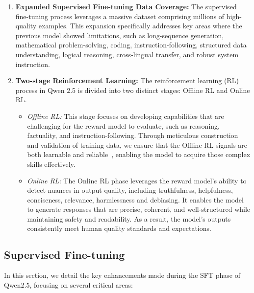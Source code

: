 \documentclass{article}
\begin{document}
\begin{enumerate}[label=(\arabic*)]

    \item \textbf{Expanded Supervised Fine-tuning Data Coverage:} The supervised fine-tuning process leverages a massive dataset comprising millions of high-quality examples.
    This expansion specifically addresses key areas where the previous model showed limitations, such as long-sequence generation, mathematical problem-solving, coding, instruction-following, structured data understanding, logical reasoning, cross-lingual transfer, and robust system instruction.

    \item \textbf{Two-stage Reinforcement Learning:} The reinforcement learning (RL) process in Qwen 2.5 is divided into two distinct stages: Offline RL and Online RL. 

        \begin{itemize}

            \item \textit{Offline RL:} This stage focuses on developing capabilities that are challenging for the reward model to evaluate, such as reasoning, factuality, and instruction-following.
            Through meticulous construction and validation of training data, we ensure that the Offline RL signals are both learnable and reliable~\citep{xiang2024aligning}, enabling the model to acquire those complex skills effectively.
            
            \item \textit{Online RL:} The Online RL phase leverages the reward model's ability to detect nuances in output quality, including truthfulness, helpfulness, conciseness, relevance, harmlessness and debiasing. 
            It enables the model to generate responses that are precise, coherent, and well-structured while maintaining safety and readability. As a result, the model's outputs consistently meet human quality standards and expectations.

        \end{itemize}

\end{enumerate}

\subsection{Supervised Fine-tuning}

In this section, we detail the key enhancements made during the SFT phase of Qwen2.5, focusing on several critical areas:
\end{document}
